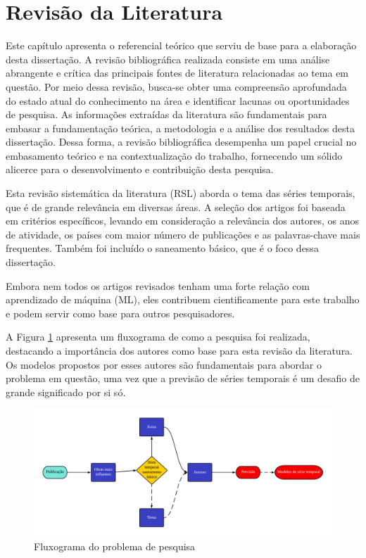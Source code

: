 \section{Revis\~ao da Literatura}\label{sec:refteo}


Este capítulo apresenta o referencial teórico que serviu de base para a elaboração desta dissertação. A revisão bibliográfica realizada consiste em uma análise abrangente e crítica das principais fontes de literatura relacionadas ao tema em questão. Por meio dessa revisão, busca-se obter uma compreensão aprofundada do estado atual do conhecimento na área e identificar lacunas ou oportunidades de pesquisa. As informações extraídas da literatura são fundamentais para embasar a fundamentação teórica, a metodologia e a análise dos resultados desta dissertação. Dessa forma, a revisão bibliográfica desempenha um papel crucial no embasamento teórico e na contextualização do trabalho, fornecendo um sólido alicerce para o desenvolvimento e contribuição desta pesquisa.

Esta revisão sistemática da literatura (RSL) aborda o tema das séries temporais, que é de grande relevância em diversas áreas. A seleção dos artigos foi baseada em critérios específicos, levando em consideração a relevância dos autores, os anos de atividade, os países com maior número de publicações e as palavras-chave mais frequentes. Também foi incluído o saneamento básico, que é o foco dessa dissertação.

Embora nem todos os artigos revisados tenham uma forte relação com aprendizado de máquina (ML), eles contribuem cientificamente para este trabalho e podem servir como base para outros pesquisadores.

A Figura \ref{fig:serie-temporal} apresenta um fluxograma de como a pesquisa foi realizada, destacando a importância dos autores como base para esta revisão da literatura. Os modelos propostos por esses autores são fundamentais para abordar o problema em questão, uma vez que a previsão de séries temporais é um desafio de grande significado por si só.

\begin{figure}[H]
	\centering
	\caption{Fluxograma do problema de pesquisa}
	\label{fig:serie-temporal}
	\includegraphics[width=1\linewidth]{Revisao/Figuras/serie_temporal}
	
\end{figure}

